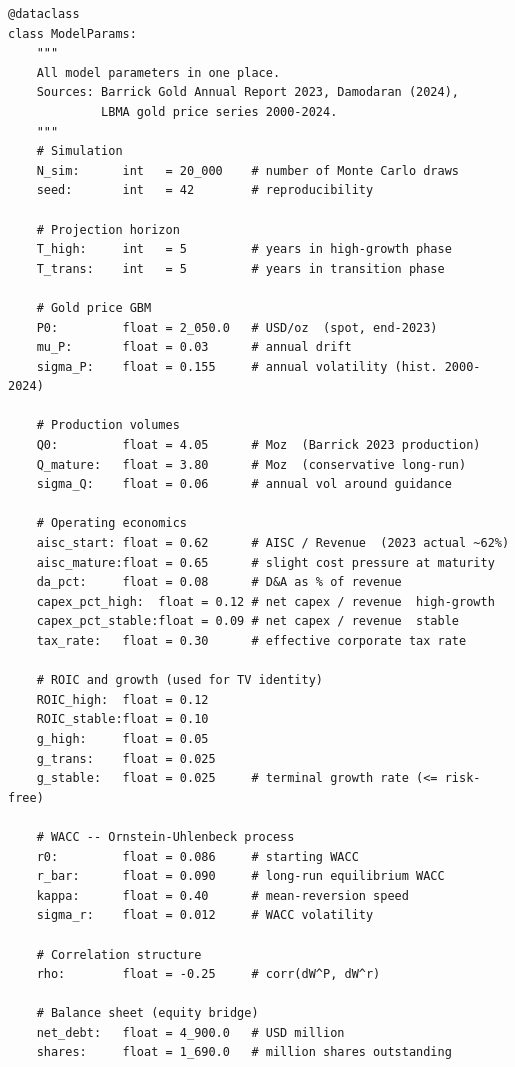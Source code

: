 \begin{lstlisting}[style=python, caption={ModelParams dataclass — all calibrated inputs}]
@dataclass
class ModelParams:
    """
    All model parameters in one place.
    Sources: Barrick Gold Annual Report 2023, Damodaran (2024),
             LBMA gold price series 2000-2024.
    """
    # Simulation
    N_sim:      int   = 20_000    # number of Monte Carlo draws
    seed:       int   = 42        # reproducibility

    # Projection horizon
    T_high:     int   = 5         # years in high-growth phase
    T_trans:    int   = 5         # years in transition phase

    # Gold price GBM
    P0:         float = 2_050.0   # USD/oz  (spot, end-2023)
    mu_P:       float = 0.03      # annual drift
    sigma_P:    float = 0.155     # annual volatility (hist. 2000-2024)

    # Production volumes
    Q0:         float = 4.05      # Moz  (Barrick 2023 production)
    Q_mature:   float = 3.80      # Moz  (conservative long-run)
    sigma_Q:    float = 0.06      # annual vol around guidance

    # Operating economics
    aisc_start: float = 0.62      # AISC / Revenue  (2023 actual ~62%)
    aisc_mature:float = 0.65      # slight cost pressure at maturity
    da_pct:     float = 0.08      # D&A as % of revenue
    capex_pct_high:  float = 0.12 # net capex / revenue  high-growth
    capex_pct_stable:float = 0.09 # net capex / revenue  stable
    tax_rate:   float = 0.30      # effective corporate tax rate

    # ROIC and growth (used for TV identity)
    ROIC_high:  float = 0.12
    ROIC_stable:float = 0.10
    g_high:     float = 0.05
    g_trans:    float = 0.025
    g_stable:   float = 0.025     # terminal growth rate (<= risk-free)

    # WACC -- Ornstein-Uhlenbeck process
    r0:         float = 0.086     # starting WACC
    r_bar:      float = 0.090     # long-run equilibrium WACC
    kappa:      float = 0.40      # mean-reversion speed
    sigma_r:    float = 0.012     # WACC volatility

    # Correlation structure
    rho:        float = -0.25     # corr(dW^P, dW^r)

    # Balance sheet (equity bridge)
    net_debt:   float = 4_900.0   # USD million
    shares:     float = 1_690.0   # million shares outstanding
\end{lstlisting}


